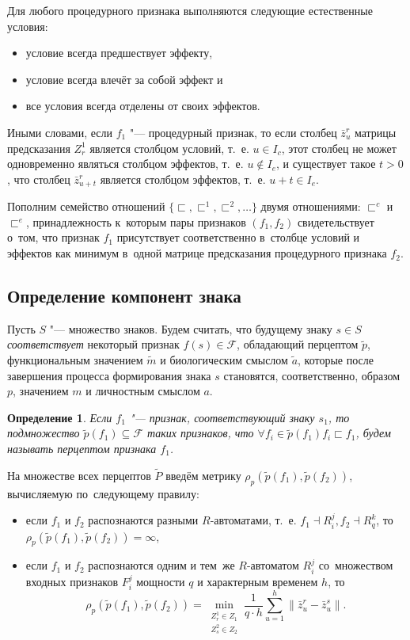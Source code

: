 \documentclass[a4paper, 12pt]{article}
\theoremstyle{plain}
\newtheorem{Def}{Определение}
\begin{document}
	Для любого процедурного признака выполняются следующие естественные условия:
	\begin{itemize}
		\item условие всегда предшествует эффекту,
		\item условие всегда влечёт за собой эффект и
		\item все условия всегда отделены от своих эффектов.
	\end{itemize}
		
	Иными словами, если $f_1$ "--- процедурный признак, то если столбец $\bar z_u^r$ матрицы предсказания $Z_r^1$ является столбцом условий, т.~е. $u\in{I_c}$, этот столбец не может одновременно являться столбцом эффектов, т.~е. $u\not\in I_e$, и существует такое $t>0$, что столбец $\bar z_{u+t}^r$ является столбцом эффектов, т.~е. $u+t\in I_e$.
		
	Пополним семейство отношений $\{\sqsubset,\sqsubset^1,\sqsubset^2,\dots\}$ двумя отношениями: $\sqsubset^c$ и $\sqsubset^e$, принадлежность к~которым пары признаков $(f_1,f_2)$ свидетельствует о~том, что признак $f_1$ присутствует соответственно в~столбце условий и эффектов как минимум в~одной матрице предсказания процедурного признака $f_2$.
		
	\subsection{Определение компонент знака}
	Пусть $S$ "--- множество знаков. Будем считать, что будущему знаку $s\in S$ \textit{соответствует} некоторый признак $f(s)\in\mathcal F$, обладающий перцептом $\tilde p$, функциональным значением $\tilde m$ и биологическим смыслом $\tilde a$, которые после завершения процесса формирования знака $s$ становятся, соответственно, образом $p$, значением $m$ и личностным смыслом $a$.
	
	\begin{Def}
		Если $f_1$ "--- признак, соответствующий знаку $s_1$, то подмножество $\tilde p(f_1)\subseteq\mathcal F$ таких признаков, что $\forall f_i\in\tilde p(f_1) f_i\sqsubset f_1$, будем называть перцептом признака $f_1$.
	\end{Def}
	
	На множестве всех перцептов $\tilde P$ введём метрику $\rho_p(\tilde p(f_1),\tilde p(f_2))$, вычисляемую по~следующему правилу:
	\begin{itemize}
		\item если $f_1$ и $f_2$ распознаются разными $R$-автоматами, т.~е. $f_1\dashv R_i^j, f_2\dashv R_q^k$, то $\rho_p(\tilde p(f_1),\tilde p(f_2))=\infty$,
		\item если $f_1$ и $f_2$ распознаются одним и тем~же $R$-автоматом $R_i^j$ со~множеством входных признаков $F_i^j$ мощности $q$ и характерным временем $h$, то
		\begin{equation}
			\rho_p(\tilde p(f_1),\tilde p(f_2))=\min\limits_{\substack{Z_r^1\in Z_1\\Z_s^2\in Z_2}}\frac{1}{q\cdot h}\sum\limits_{u=1}^h\|\bar z_u^r-\bar z_u^s\|.
		\end{equation} 
	\end{itemize}
	
\end{document}
